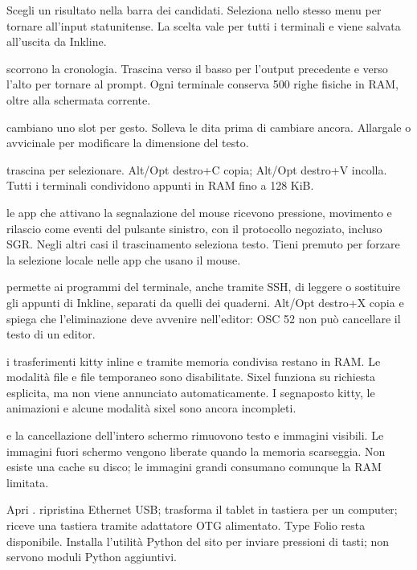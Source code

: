Scegli un risultato nella barra dei candidati. Seleziona
 nello stesso menu per tornare all'input statunitense.
La scelta vale per tutti i terminali e viene salvata all'uscita da Inkline.

 scorrono la cronologia. Trascina verso il basso per
l'output precedente e verso l'alto per tornare al prompt. Ogni terminale
conserva 500 righe fisiche in RAM, oltre alla schermata corrente.

 cambiano uno slot per gesto.
Solleva le dita prima di cambiare ancora. Allargale o avvicinale per
modificare la dimensione del testo.

 trascina per selezionare. Alt/Opt destro+C copia;
Alt/Opt destro+V incolla. Tutti i terminali condividono appunti in RAM
fino a 128 KiB.

 le app che attivano la segnalazione del mouse ricevono pressione,
movimento e rilascio come eventi del pulsante sinistro, con il protocollo
negoziato, incluso SGR. Negli altri casi il trascinamento seleziona testo.
Tieni premuto  per forzare la selezione locale nelle app che usano il mouse.

 permette ai programmi del terminale, anche tramite SSH, di
leggere o sostituire gli appunti di Inkline, separati da quelli dei quaderni.
Alt/Opt destro+X copia e spiega che l'eliminazione deve avvenire nell'editor:
OSC 52 non può cancellare il testo di un editor.

 i trasferimenti kitty inline e tramite memoria condivisa restano
in RAM. Le modalità file e file temporaneo sono disabilitate. Sixel funziona
su richiesta esplicita, ma non viene annunciato automaticamente. I segnaposto
kitty, le animazioni e alcune modalità sixel sono ancora incompleti.

 e la cancellazione dell'intero schermo rimuovono testo e immagini
visibili. Le immagini fuori schermo vengono liberate quando la memoria scarseggia.
Non esiste una cache su disco; le immagini grandi consumano comunque la RAM limitata.

Apri .  ripristina Ethernet USB;
 trasforma il tablet in tastiera per un computer;
 riceve una tastiera tramite adattatore OTG alimentato.
Type Folio resta disponibile. Installa l'utilità Python del sito per inviare
pressioni di tasti; non servono moduli Python aggiuntivi.

